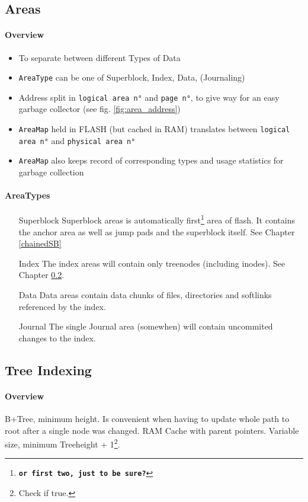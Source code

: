 \subsection{Areas}
\label{areas}
\paragraph{Overview}
\begin{itemize}
	\item To separate between different Types of Data
	\item \texttt{AreaType} can be one of Superblock, Index, Data, (Journaling)
	\item Address split in \texttt{logical area n°} and \texttt{page n°}, to give way for an easy garbage collector (see  fig. \ref{fig:area_address})
	\item \texttt{AreaMap} held in FLASH (but cached in RAM) translates between \texttt{logical area n°} and \texttt{physical area n°}
	\item \texttt{AreaMap} also keeps record of corresponding types and usage statistics for garbage collection
\end{itemize}

\paragraph{AreaTypes}
\begin{itemize}
	\item[Superblock] Superblock areas is automatically first\footnote{\texttt{\textbf{or first two, just to be sure?}}} area of flash. It contains the anchor area as well as jump pads and the superblock itself. See Chapter \ref{chainedSB}
	\item[Index] The index areas will contain only treenodes (including inodes). See Chapter \ref{b+tree}.
	\item[Data] Data areas contain data chunks of files, directories and softlinks referenced by the index.
	\item[Journal] The single Journal area (somewhen) will contain uncommited changes to the index.
\end{itemize}

\subsection{Tree Indexing}
\label{b+tree}
\paragraph{Overview}
B+Tree, minimum height. Is convenient when having to update whole path to root after a single node was changed. RAM Cache with parent pointers. Variable size, minimum Treeheight + 1\footnote{Check if true.}.

